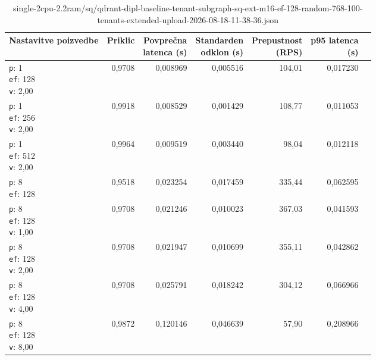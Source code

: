 \begin{table}[htbp]
  \centering
\small
  \caption{single-2cpu-2.2ram/sq/qdrant-dipl-baseline-tenant-subgraph-sq-ext-m16-ef-128-random-768-100-tenants-extended-upload-2026-08-18-11-38-36.json}
  \label{tab:single-2cpu-2.2ram:sq:qdrant-dipl-baseline-tenant-subgraph-sq-ext-m16-ef-128-random-768-100-tenants-extended-upload-2026-08-18-11-38-36.json}
  \begin{tabularx}{\textwidth}{Xrrrrrr}
    \toprule
    Nastavitve poizvedbe & Priklic & \makecell{Povprečna\\latenca (s)} & \makecell{Standarden\\odklon (s)} & \makecell{Prepustnost\\(RPS)} & \makecell{p95 latenca\\(s)}  \\
    \midrule
    \makecell{\texttt{p}: 1\\\texttt{ef}: 128\\\texttt{v}: 2,00} & 0,9708 & 0,008969 & 0,005516 & 104,01 & 0,017230 \\
    \makecell{\texttt{p}: 1\\\texttt{ef}: 256\\\texttt{v}: 2,00} & 0,9918 & 0,008529 & 0,001429 & 108,77 & 0,011053 \\
    \makecell{\texttt{p}: 1\\\texttt{ef}: 512\\\texttt{v}: 2,00} & 0,9964 & 0,009519 & 0,003440 & 98,04 & 0,012118 \\
    \makecell{\texttt{p}: 8\\\texttt{ef}: 128} & 0,9518 & 0,023254 & 0,017459 & 335,44 & 0,062595 \\
    \makecell{\texttt{p}: 8\\\texttt{ef}: 128\\\texttt{v}: 1,00} & 0,9708 & 0,021246 & 0,010023 & 367,03 & 0,041593 \\
    \makecell{\texttt{p}: 8\\\texttt{ef}: 128\\\texttt{v}: 2,00} & 0,9708 & 0,021947 & 0,010699 & 355,11 & 0,042862 \\
    \makecell{\texttt{p}: 8\\\texttt{ef}: 128\\\texttt{v}: 4,00} & 0,9708 & 0,025791 & 0,018242 & 304,12 & 0,066966 \\
    \makecell{\texttt{p}: 8\\\texttt{ef}: 128\\\texttt{v}: 8,00} & 0,9872 & 0,120146 & 0,046639 & 57,90 & 0,208966 \\

\end{tabularx}
\end{table}
